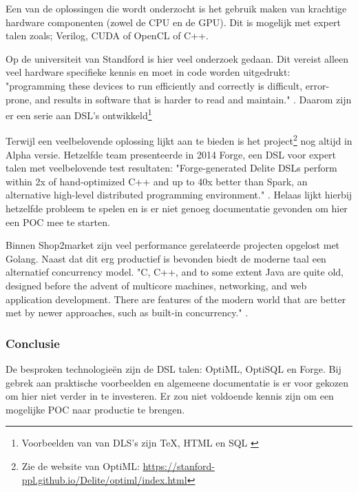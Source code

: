 Een van de oplossingen die wordt onderzocht is het gebruik maken van krachtige hardware componenten (zowel de CPU en de GPU). Dit is mogelijk met expert talen zoals; Verilog, CUDA of OpenCL of C++.

Op de universiteit van Standford is hier veel onderzoek gedaan. Dit vereist alleen veel hardware specifieke kennis en moet in code worden uitgedrukt: "programming these devices to run efficiently and correctly is difficult, error-prone, and results in software that is harder to read and maintain." \parencite{sujeeth2011optiml}. Daarom zijn er een serie aan DSL's ontwikkeld\footnote{Voorbeelden van van DLS's zijn \TeX, HTML en SQL  \parencite{sigplan2000dsl}}

Terwijl \textcite{sujeeth2011optiml} een veelbelovende oplossing lijkt aan te bieden is het project\footnote{Zie de website van OptiML: \url{https://stanford-ppl.github.io/Delite/optiml/index.html}} nog altijd in Alpha versie. Hetzelfde team presenteerde in 2014 Forge, een DSL voor expert talen met veelbelovende test resultaten: "Forge-generated Delite DSLs perform within 2x of hand-optimized C++ and up to 40x better than Spark, an alternative high-level distributed programming environment." \parencite{sujeeth2014forge}. Helaas lijkt hierbij hetzelfde probleem te spelen en is er niet genoeg documentatie gevonden om hier een POC mee te starten.

Binnen Shop2market zijn veel performance gerelateerde projecten opgelost met Golang. Naast dat dit erg productief is bevonden biedt de moderne taal een alternatief concurrency model. "C, C++, and to some extent Java are quite old, designed before the advent of multicore machines, networking, and web application development. There are features of the modern world that are better met by newer approaches, such as built-in concurrency." \parencite{pike2012go}.

\subsubsection{\textbf{Conclusie}}

De besproken technologieën zijn de DSL talen: OptiML, OptiSQL en Forge. Bij gebrek aan praktische voorbeelden en algemeene documentatie is er voor gekozen om hier niet verder in te investeren. Er zou niet voldoende kennis zijn om een mogelijke POC naar productie te brengen. 


